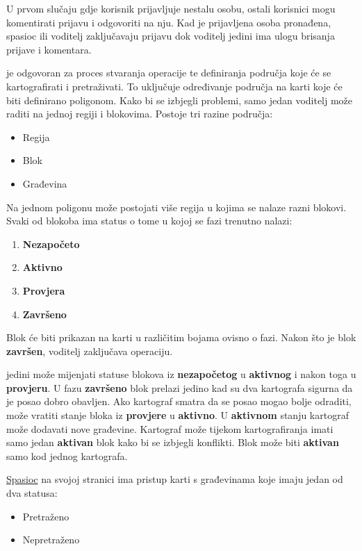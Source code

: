 			U prvom slučaju gdje korisnik prijavljuje nestalu osobu, ostali korisnici mogu komentirati prijavu i odgovoriti na nju. Kad je prijavljena osoba pronađena, spasioc ili voditelj zaključavaju prijavu dok voditelj jedini ima ulogu brisanja prijave i komentara.
			
			 je odgovoran za proces stvaranja operacije te definiranja područja koje će se kartografirati i pretraživati. To uključuje određivanje područja na karti koje će biti definirano poligonom. Kako bi se izbjegli problemi, samo jedan voditelj može raditi na jednoj regiji i blokovima.
			Postoje tri razine područja:
			\begin{itemize}
				\item Regija
				\item Blok
				\item Građevina
			\end{itemize}
			
			Na jednom poligonu može postojati više regija u kojima se nalaze razni blokovi. Svaki od blokoba ima status o tome u kojoj se fazi trenutno nalazi:
			\begin{enumerate}
				\item \textbf{Nezapočeto}
				\item \textbf{Aktivno}
				\item \textbf{Provjera}
				\item \textbf{Završeno}
			\end{enumerate}
			
			Blok će biti prikazan na karti u različitim bojama ovisno o fazi. Nakon što je blok \textbf{završen}, voditelj zaključava operaciju.
			
			 jedini može mijenjati statuse blokova iz \textbf{nezapočetog} u \textbf{aktivnog} i nakon toga u \textbf{provjeru}. U fazu \textbf{završeno} blok prelazi jedino kad su dva kartografa sigurna da je posao dobro obavljen. Ako kartograf smatra da se posao mogao bolje odraditi, može vratiti stanje bloka iz \textbf{provjere} u \textbf{aktivno}. U \textbf{aktivnom} stanju kartograf može dodavati nove građevine. Kartograf može tijekom kartografiranja imati samo jedan \textbf{aktivan} blok kako bi se izbjegli konflikti. Blok može biti \textbf{aktivan} samo kod jednog kartografa.
			
			\underline{Spasioc} na svojoj stranici ima pristup karti s građevinama koje imaju jedan od dva statusa:
			\begin{itemize}
				\item Pretraženo
				\item Nepretraženo
			\end{itemize}
			
